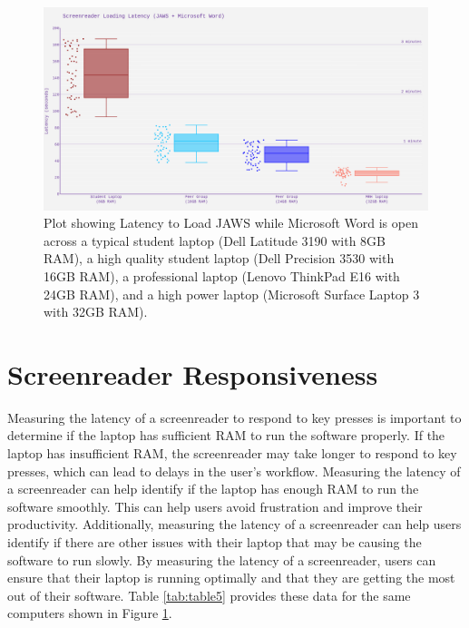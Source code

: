 \begin{figure}[H]
	\centering
	\includegraphics[width=\textwidth]{images/ComputerRBDisplaySpecsTVIFig1.png}

	\caption[Latency to Load JAWS]{Plot showing Latency to Load JAWS while Microsoft Word is open across a typical student laptop (Dell Latitude 3190 with 8GB RAM), a high quality student laptop (Dell Precision 3530 with 16GB RAM), a professional laptop (Lenovo ThinkPad E16 with 24GB RAM), and a high power laptop (Microsoft Surface Laptop 3 with 32GB RAM).}\label{fig:figure 1}
\end{figure}

\pagebreak
\hypertarget{screenreader-response}{}\section{Screenreader Responsiveness}\label{screenreader-response}
Measuring the latency of a screenreader to respond to key presses is important to determine if the laptop has sufficient RAM to run the software properly. If the laptop has insufficient RAM, the screenreader may take longer to respond to key presses, which can lead to delays in the user’s workflow. Measuring the latency of a screenreader can help identify if the laptop has enough RAM to run the software smoothly. This can help users avoid frustration and improve their productivity. Additionally, measuring the latency of a screenreader can help users identify if there are other issues with their laptop that may be causing the software to run slowly. By measuring the latency of a screenreader, users can ensure that their laptop is running optimally and that they are getting the most out of their software. Table \ref{tab:table5} provides these data for the same computers shown in Figure \ref{fig:figure 1}.

